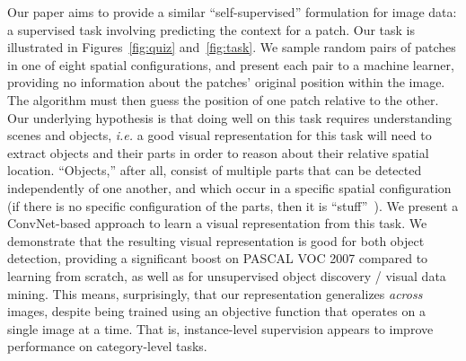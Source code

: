 \documentclass[10pt,twocolumn,letterpaper]{article}
\begin{document}
Our paper aims to provide a similar ``self-supervised'' formulation for image data: a supervised task involving predicting the context for a patch. Our task 
is illustrated in Figures~\ref{fig:quiz} and~\ref{fig:task}.  We sample random pairs of patches in one of eight spatial configurations, and present each pair to a machine learner, providing no information about the patches' original position within the image.  The algorithm must then guess the position of one patch relative to the other.  Our underlying hypothesis is that doing well on this task requires understanding scenes and objects, {\em i.e.} a good visual representation for this task will need to extract objects and their parts in order to reason about their relative spatial location. ``Objects,'' after all, consist of multiple parts that can be detected independently of one another, and which occur in a specific spatial configuration (if there is no specific configuration of the parts, then it is  ``stuff''~\cite{adelson2001seeing}).
We present a ConvNet-based approach to learn a visual representation from this task. We demonstrate that the resulting visual representation is good for both object detection, providing a significant boost on PASCAL VOC 2007 compared to learning from scratch, as well as for unsupervised object discovery / visual data mining.  This means, surprisingly, that our representation generalizes {\em across} images, despite being trained using an objective function that operates on a single image at a time.   That is, instance-level supervision appears to improve performance on category-level tasks.



\vspace{-0.05in}
\end{document}
